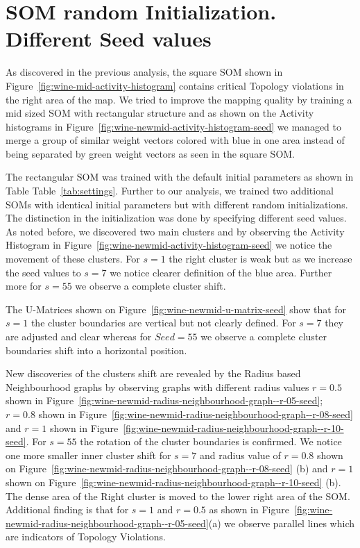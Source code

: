 \documentclass{acm_proc_article-sp}
\begin{document}
\section{SOM random Initialization. Different Seed values}

As discovered in the previous analysis, the square SOM shown in Figure~\ref{fig:wine-mid-activity-histogram} contains critical Topology violations in the right area of the map. We tried to improve the mapping quality by training a mid sized SOM with rectangular structure and as shown on the Activity histograms in Figure~\ref{fig:wine-newmid-activity-histogram-seed} we managed to merge a group of similar weight vectors colored with blue in one area instead of being separated by green weight vectors as seen in the square SOM.

The rectangular SOM was trained with the default initial parameters as shown in Table Table~\ref{tab:settings}. Further to our analysis, we trained two additional SOMs with identical initial parameters but with different random initializations. The distinction in the initialization was done by specifying different seed values. As noted before, we discovered two main clusters and by observing the Activity Histogram in Figure~\ref{fig:wine-newmid-activity-histogram-seed} we notice the movement of these clusters. For $s = 1$ the right cluster is weak but as we increase the seed values to $s = 7$ we notice clearer definition of the blue area. Further more for $s = 55$ we observe a complete cluster shift.

The U-Matrices shown on Figure~\ref{fig:wine-newmid-u-matrix-seed} show that for $s = 1$ the cluster boundaries are vertical but not clearly defined. For $s = 7$ they are adjusted and clear whereas for $Seed = 55$ we observe a complete cluster boundaries shift into a horizontal position. 

New discoveries of the clusters shift are revealed by the Radius based Neighbourhood graphs by observing graphs with different radius values $r = 0.5$ shown in Figure~\ref{fig:wine-newmid-radius-neighbourhood-graph--r-05-seed}; $r= 0.8$ shown in Figure~\ref{fig:wine-newmid-radius-neighbourhood-graph--r-08-seed} and $r = 1$ shown in Figure~\ref{fig:wine-newmid-radius-neighbourhood-graph--r-10-seed}. 
For $s = 55$ the rotation of the cluster boundaries is confirmed. We notice one more smaller inner cluster shift for $s = 7$ and radius value of $r = 0.8$ shown on Figure~\ref{fig:wine-newmid-radius-neighbourhood-graph--r-08-seed} (b) and $r = 1$ shown on Figure~\ref{fig:wine-newmid-radius-neighbourhood-graph--r-10-seed} (b). The dense area of the Right cluster is moved to the lower right area of the SOM. Additional finding is that for $s = 1$ and $r = 0.5$ as shown in Figure~\ref{fig:wine-newmid-radius-neighbourhood-graph--r-05-seed}(a) we observe parallel lines which are indicators of Topology Violations.
\end{document}
